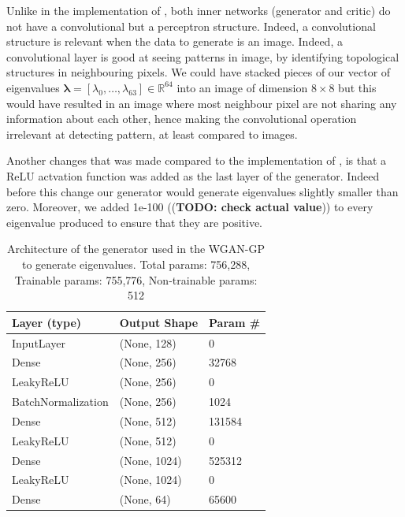 \documentclass{article}
\begin{document}
Unlike in the implementation of \cite{nain2020wgangp}, both inner networks (generator and critic) do not have a convolutional but a perceptron structure. Indeed, a convolutional structure is relevant when the data to generate is an image. Indeed, a convolutional layer is good at seeing patterns in image, by identifying topological structures in neighbouring pixels. We could have stacked pieces of our vector of eigenvalues $\mathbf{\lambda} = [\lambda_0, \dots, \lambda_{63}] \in \mathbb{R}^{64}$  into an image of dimension $8 \times 8$ but this would have resulted in an image where most neighbour pixel are not sharing any information about each other, hence making the convolutional operation irrelevant at detecting pattern, at least compared to images. 

Another changes that was made compared to the implementation of \cite{nain2020wgangp}, is that a ReLU actvation function was added as the last layer of the generator. Indeed before this change our generator would generate eigenvalues slightly smaller than zero. Moreover, we added 1e-100 ((\textbf{TODO: check actual value})) to every eigenvalue produced to ensure that they are positive.


\begin{table}[]
    \begin{tabular}{|l|l|l|}
        \hline
        \textbf{Layer (type)} & \textbf{Output Shape} & \textbf{Param \#} \\ \hline
        InputLayer            & (None, 128)           & 0                 \\ \hline
        Dense                 & (None, 256)           & 32768             \\ \hline
        LeakyReLU             & (None, 256)           & 0                 \\ \hline
        BatchNormalization    & (None, 256)           & 1024              \\ \hline
        Dense                 & (None, 512)           & 131584            \\ \hline
        LeakyReLU             & (None, 512)           & 0                 \\ \hline
        Dense                 & (None, 1024)          & 525312            \\ \hline
        LeakyReLU             & (None, 1024)          & 0                 \\ \hline
        Dense                 & (None, 64)            & 65600             \\ \hline
        \end{tabular}
    \caption{Architecture of the generator used in the WGAN-GP to generate eigenvalues. Total params: 756,288, Trainable params: 755,776, Non-trainable params: 512}
    \label{tab:evals_generator_WGANGP_architecture}
\end{table}
\end{document}
